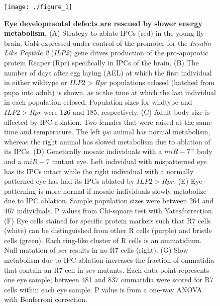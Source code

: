 \begin{figure}[h!]
\label{fig:metabolism:fig1}
\centering
\texttt{[image: ./figure\_1]}
\caption[Eye developmental defects are rescued by slower energy metabolism.]{\textbf{Eye developmental defects are rescued by slower energy metabolism.} (A) Strategy to ablate IPCs (red) in the young fly brain. Gal4 expressed under control of the promoter for the \textit{Insulin-Like Peptide 2} (\textit{ILP2}) gene drives production of the pro-apoptotic protein Reaper (Rpr) specifically in IPCs of the brain. (B) The number of days after egg laying (AEL) at which the first individual in either wildtype or $ILP2>Rpr$ populations eclosed (hatched from pupa into adult) is shown, as is the time at which the last individual in each population eclosed. Population sizes for wildtype and $ILP2>Rpr$ were 126 and 185, respectively. (C) Adult body size is affected by IPC ablation. Two females that were raised at the same time and temperature. The left $y w$ animal has normal metabolism, whereas the right animal has slowed metabolism due to ablation of its IPCs. (D) Genetically mosaic individuals with a $miR-7^+$ body and a $miR-7$ mutant eye. Left individual with mispatterned eye has its IPCs intact while the right individual with a normally patterned eye has had its IPCs ablated by $ILP2>Rpr$. (E) Eye patterning is more normal if mosaic individuals slowly metabolize due to IPC ablation. Sample population sizes were between 264 and 467 individuals. P values from Chi-square test with Yates\' correction. (F) Eye cells stained for specific protein markers such that R7 cells (white) can be distinguished from other R cells (purple) and bristle cells (green). Each ring-like cluster of R cells is an ommatidium. Null mutation of \textit{sev} results in no R7 cells (right). (G) Slow metabolism due to IPC ablation increases the fraction of ommatidia that contain an R7 cell in \textit{sev} mutants. Each data point represents one eye sample; between 481 and 837 ommatidia were scored for R7 cells within each eye sample. P value is from a one-way ANOVA with Bonferroni correction.}
\end{figure}


